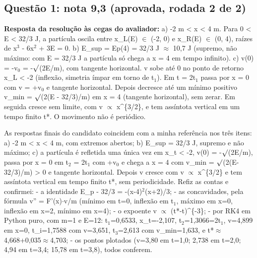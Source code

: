 \documentclass{article}%
\begin{document}
\subsection*{Questão 1: nota 9,3 (aprovada, rodada 2 de 2)}%
\textbf{Resposta da resolução às cegas do avaliador:} a) -2 m < x < 4 m. Para 0 < E < 32/3 J, a partícula oscila entre x\_L(E) $\in$ (-2, 0) e x\_R(E) $\in$ (0, 4), raízes de x$^3$ - 6x$^2$ + 3E = 0.\newline%
b) E\_sup = Ep(4) = 32/3 J $\approx$ 10,7 J (supremo, não máximo: com E = 32/3 J a partícula só chega a x = 4 em tempo infinito).\newline%
c) v(0) = -v$_{0}$ = -$\surd$(2E/m), com tangente horizontal. v sobe até 0 no ponto de retorno x\_L < -2 (inflexão, simetria ímpar em torno de t$_{1}$). Em t = 2t$_{1}$ passa por x = 0 com v = +v$_{0}$ e tangente horizontal. Depois decresce até um mínimo positivo v\_min = $\surd$(2(E - 32/3)/m) em x = 4 (tangente horizontal), sem zerar. Em seguida cresce sem limite, com v $\propto$ x\^{}\{3/2\}, e tem assíntota vertical em um tempo finito t*. O movimento não é periódico.\par %
As respostas finais do candidato coincidem com a minha referência nos três itens: a) -2 m < x < 4 m, com extremos abertos; b) E\_sup = 32/3 J, supremo e não máximo; c) a partícula é refletida uma única vez em x\_t < -2, v(0) = -$\surd$(2E/m), passa por x = 0 em t$_{2}$ = 2t$_{1}$ com +v$_{0}$ e chega a x = 4 com v\_min = $\surd$(2(E-32/3)/m) > 0 e tangente horizontal. Depois v cresce com v $\propto$ x\^{}\{3/2\} e tem assíntota vertical em tempo finito t*, sem periodicidade.\newline%
\newline%
Refiz as contas e confirmei:\newline%
{-} a identidade E\_p - 32/3 = -(x-4)$^2$(x+2)/3;\newline%
{-} as concavidades, pela fórmula v'' = F'(x)$\cdot$v/m (mínimo em t=0, inflexão em t$_{1}$, máximo em x=0, inflexão em x=2, mínimo em x=4);\newline%
{-} o expoente v $\propto$ (t*-t)\^{}\{-3\};\newline%
{-} por RK4 em Python puro, com m=1 e E=12: t$_{1}$=0,6533, x\_t=-2,107, t$_{2}$=1,3066=2t$_{1}$, v=4,899 em x=0, t\_i=1,7588 com v=3,651, t$_{3}$=2,613 com v\_min=1,633, e t*$\approx$4,668+0,035$\approx$4,703;\newline%
{-} os pontos plotados (v=3,80 em t=1,0; 2,738 em t=2,0; 4,94 em t=3,4; 15,78 em t=3,8), todos conferem.\newline%
\end{document}
